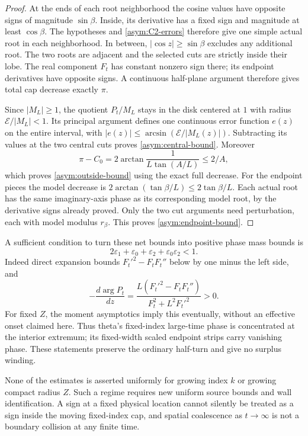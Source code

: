 \documentclass[11pt]{article}
\theoremstyle{definition}
\begin{document}
\begin{proof}
At the ends of each root neighborhood the cosine values have opposite
signs of magnitude $\sin\beta$.  Inside, its derivative has a fixed
sign and magnitude at least $\cos\beta$.  The hypotheses and
\eqref{asym:C2-errors} therefore give one simple actual root in each
neighborhood.  In between, $|\cos z|\ge\sin\beta$ excludes any
additional root.  The two roots are adjacent and the selected cuts
are strictly inside their lobe.  The real component $F_t$ has constant
nonzero sign there; its endpoint derivatives have opposite signs.
A continuous half-plane argument therefore gives total cap decrease
exactly $\pi$.

Since $|M_L|\ge1$, the quotient $P_t/M_L$ stays in the disk centered
at $1$ with radius $\mathcal E/|M_L|<1$.  Its principal argument defines
one continuous error function $e(z)$ on the entire interval, with
$|e(z)|\le\arcsin(\mathcal E/|M_L(z)|)$.  Subtracting its values at
the two central cuts proves \eqref{asym:central-bound}.  Moreover
\[
 \pi-C_0=2\arctan\frac1{L\tan(A/L)}\le2/A,
\]
which proves \eqref{asym:outside-bound} using the exact full decrease.
For the endpoint pieces the model decrease is
$2\arctan(\tan\beta/L)\le2\tan\beta/L$.
Each actual root has the same imaginary-axis phase as its corresponding
model root, by the derivative signs already proved.  Only the two cut
arguments need perturbation, each with model modulus $r_\beta$.
This proves \eqref{asym:endpoint-bound}.
\end{proof}

A sufficient condition to turn these net bounds into positive phase
mass bounds is
\begin{equation}\label{asym:monotone-phase}
 2\varepsilon_1+\varepsilon_0+\varepsilon_2+
       \varepsilon_0\varepsilon_2<1.
\end{equation}
Indeed direct expansion bounds $F_t'^2-F_tF_t''$ below by one minus
the left side, and
\[
 -\frac{d\arg P_t}{dz}
 =\frac{L(F_t'^2-F_tF_t'')}{F_t^2+L^2F_t'^2}>0.
\]
For fixed $Z$, the moment asymptotics imply this eventually, without
an effective onset claimed here.  Thus theta's fixed-index large-time
phase is concentrated at the interior extremum; its fixed-width scaled
endpoint strips carry vanishing phase.  These statements preserve the
ordinary half-turn and give no surplus winding.

None of the estimates is asserted uniformly for growing index $k$ or
growing compact radius $Z$.  Such a regime requires new uniform source
bounds and wall identification.  A sign at a fixed physical location
cannot silently be treated as a sign inside the moving fixed-index cap,
and spatial coalescence as $t\to\infty$ is not a boundary collision at
any finite time.
\end{document}
